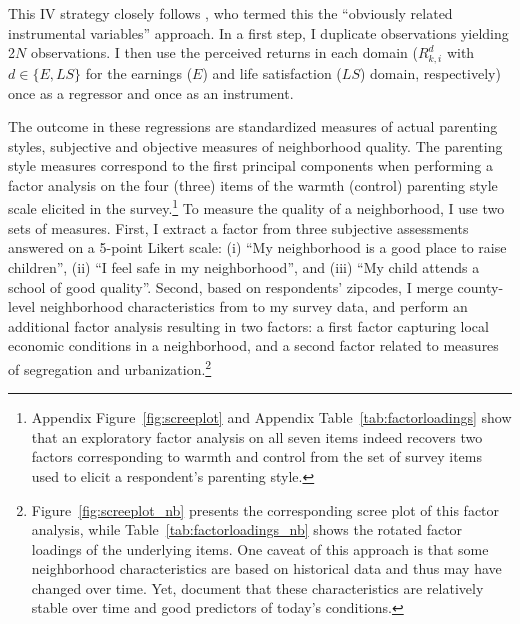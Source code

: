 \documentclass[12pt, a4paper, english]{article}
\begin{document}
This IV strategy closely follows \citet{Gillenetal2018}, who termed this the ``obviously related instrumental variables'' approach. In a first step, I duplicate observations yielding 2$N$ observations. I then use the perceived returns in each domain ($R_{k,i}^{d}$ with $d\in\{E,LS\}$ for the earnings ($E$) and life satisfaction ($LS$) domain, respectively) once as a regressor and once as an instrument. 

The outcome in these regressions are standardized measures of actual parenting styles, subjective and objective measures of neighborhood quality. The parenting style measures correspond to the first principal components when performing a factor analysis on the four (three) items of the warmth (control) parenting style scale elicited in the survey.\footnote{Appendix Figure~\ref{fig:screeplot} and Appendix Table~\ref{tab:factorloadings} show that an exploratory factor analysis on all seven items indeed recovers two factors corresponding to warmth and control from the set of survey items used to elicit a respondent's parenting style.} To measure the quality of a neighborhood, I use two sets of measures. First, I extract a factor from three subjective assessments answered on a 5-point Likert scale: (i) ``My neighborhood is a good place to raise children'', (ii) ``I feel safe in my neighborhood'', and (iii) ``My child attends a school of good quality''. Second, based on respondents' zipcodes, I merge county-level neighborhood characteristics from \citet{ChettyHendren2018Exposure,ChettyHendren2018County} to my survey data, and perform an additional factor analysis resulting in two factors: a first factor capturing local economic conditions in a neighborhood, and a second factor related to measures of segregation and urbanization.\footnote{Figure~\ref{fig:screeplot_nb} presents the corresponding scree plot of this factor analysis, while Table~\ref{tab:factorloadings_nb} shows the rotated factor loadings of the underlying items. One caveat of this approach is that some neighborhood characteristics are based on historical data and thus may have changed over time. Yet, \citet{Chettyetal2018OpportunityAtlas} document that these characteristics are relatively stable over time and good predictors of today's conditions.}
\end{document}
